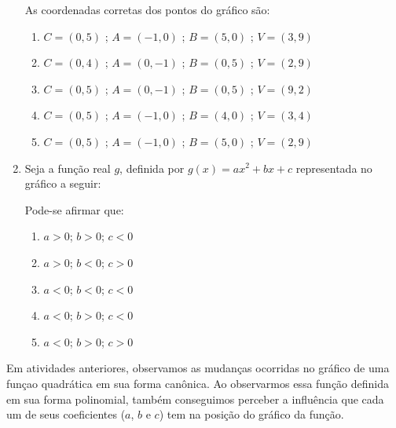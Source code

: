 \begin{enumerate}
As coordenadas corretas dos pontos do gráfico são:
\begin{enumerate}
\item {} 
\(C=(0,5)\)  ;  \(A=(-1,0)\)  ; \(B=(5,0)\)  ; \(V=(3,9)\)

\item {} 
\(C=(0,4)\)  ;  \(A=(0,-1)\)  ; \(B=(0,5)\)  ; \(V=(2,9)\)

\item {} 
\(C=(0,5)\)  ;  \(A=(0,-1)\)  ; \(B=(0,5)\)  ; \(V=(9,2)\)

\item {} 
\(C=(0,5)\)  ;  \(A=(-1,0)\)  ; \(B=(4,0)\)  ; \(V=(3,4)\)

\item {} 
\(C=(0,5)\)  ;  \(A=(-1,0)\)  ; \(B=(5,0)\)  ; \(V=(2,9)\)

\end{enumerate}
\clearpage
\item Seja a função real \(g\), definida por \(g(x)=ax^2+bx+c\) representada no gráfico a seguir:
\begin{figure}[H]
\centering

\end{figure}

Pode-se afirmar que:
\begin{enumerate}
\item {} 
\(a>0\); \(b>0\); \(c<0\)

\item {} 
\(a>0\); \(b<0\); \(c>0\)

\item {} 
\(a<0\); \(b<0\); \(c<0\)

\item {} 
\(a<0\); \(b>0\); \(c<0\)

\item {} 
\(a<0\); \(b>0\); \(c>0\)

\end{enumerate}
\end{enumerate}

\label{\detokenize{AF209-8::doc}}\label{\detokenize{AF209-8:sec-funcao-quadratica-org-ideias-intersecoes-com-eixos}}\label{\detokenize{AF209-8:organizando-as-ideias-intersecao-com-os-eixos-coordenados}}
Em atividades anteriores, observamos as mudanças ocorridas no gráfico de uma funçao quadrática em sua forma canônica. Ao observarmos essa função definida em sua forma polinomial, também conseguimos perceber a influência que cada um de seus coeficientes (\(a\), \(b\) e  \(c\)) tem na posição do gráfico da função.

